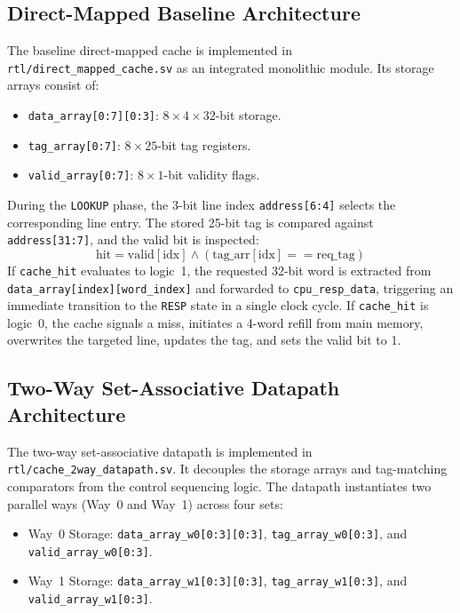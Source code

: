 \documentclass[conference]{IEEEtran}
\begin{document}
\subsection{Direct-Mapped Baseline Architecture}
The baseline direct-mapped cache is implemented in \texttt{rtl/direct\_mapped\_cache.sv} as an integrated monolithic module. Its storage arrays consist of:
\begin{itemize}
    \item \texttt{data\_array[0:7][0:3]}: $8 \times 4 \times 32$-bit storage.
    \item \texttt{tag\_array[0:7]}: $8 \times 25$-bit tag registers.
    \item \texttt{valid\_array[0:7]}: $8 \times 1$-bit validity flags.
\end{itemize}
During the \texttt{LOOKUP} phase, the 3-bit line index \texttt{address[6:4]} selects the corresponding line entry. The stored 25-bit tag is compared against \texttt{address[31:7]}, and the valid bit is inspected:
\begin{equation}
\text{hit} = \text{valid}[\text{idx}] \land (\text{tag\_arr}[\text{idx}] == \text{req\_tag})
\end{equation}
If \texttt{cache\_hit} evaluates to logic~1, the requested 32-bit word is extracted from \texttt{data\_array[index][word\_index]} and forwarded to \texttt{cpu\_resp\_data}, triggering an immediate transition to the \texttt{RESP} state in a single clock cycle. If \texttt{cache\_hit} is logic~0, the cache signals a miss, initiates a 4-word refill from main memory, overwrites the targeted line, updates the tag, and sets the valid bit to 1.

\subsection{Two-Way Set-Associative Datapath Architecture}
The two-way set-associative datapath is implemented in \texttt{rtl/cache\_2way\_datapath.sv}. It decouples the storage arrays and tag-matching comparators from the control sequencing logic. The datapath instantiates two parallel ways (Way~0 and Way~1) across four sets:
\begin{itemize}
    \item Way~0 Storage: \texttt{data\_array\_w0[0:3][0:3]}, \texttt{tag\_array\_w0[0:3]}, and \texttt{valid\_array\_w0[0:3]}.
    \item Way~1 Storage: \texttt{data\_array\_w1[0:3][0:3]}, \texttt{tag\_array\_w1[0:3]}, and \texttt{valid\_array\_w1[0:3]}.
\end{itemize}
\end{document}
